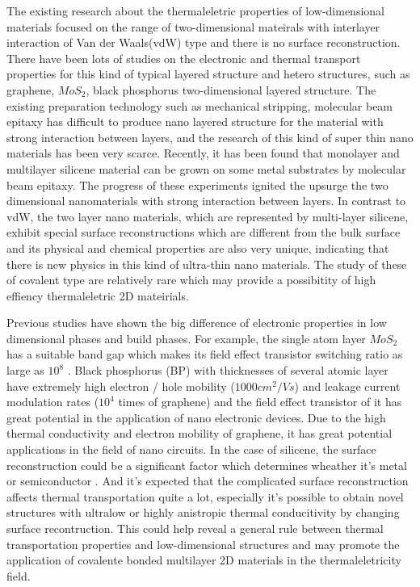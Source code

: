 \documentclass[%
 reprint,
 amsmath,amssymb,
 aps,
 prb,
]{revtex4-1}
\begin{document}
The existing research about the thermaleletric properties of low-dimensional materials focused on the range of  two-dimensional mateirals with interlayer interaction of  Van der Waals(vdW) type and there is no surface reconstruction. There have been lots of studies on the electronic and thermal transport properties for this kind of typical layered structure and hetero structures, such as graphene\cite{Lindsay2011,Ni2012,Wang2011}, $MoS_2$\cite{Liu2015}, black phosphorus\cite{Zhang2015,Peng2015,Jain2015} two-dimensional layered structure. The existing preparation technology such as mechanical stripping, molecular beam epitaxy has difficult to produce nano layered structure for the material with strong interaction between layers, and the research of this kind of super thin nano materials has been very scarce. Recently, it has been found that monolayer and multilayer silicene material can be grown on some metal substrates by molecular beam epitaxy\cite{Fleurence2012,Meng2013,Vogt2012,DePadova2013,Feng2012}. The progress of these experiments ignited the upsurge the two dimensional nanomaterials with strong interaction between layers. In contrast to vdW, the two layer nano materials, which are represented by multi-layer silicene, exhibit special surface reconstructions which are different from the bulk surface\cite{Fleurence2012,Meng2013,Feng2012,Guo2013} and its physical and chemical properties are also very unique\cite{Guo2013,Guo2015}, indicating that there is new physics in this kind of ultra-thin nano materials. The study of these of covalent type are relatively rare which may provide a possibitity of high effiency thermaleletric 2D mateirials.

Previous studies have shown the big difference of electronic properties in low dimensional phases and build phases. For example, the single atom layer $MoS_2$ has a suitable band gap which makes its field effect transistor switching ratio as large as $10^8$ \cite{Li_Yu2014}. Black phosphorus (BP) with thicknesses of several atomic layer have extremely high electron / hole mobility ($1000cm^2/Vs$) and leakage current modulation rates ($10^4$ times of graphene) and the field effect transistor of it has great potential in the application of nano electronic devices\cite{RadisavljevicB2011}. Due to the high thermal conductivity and electron mobility of graphene, it has great potential applications in the field of nano circuits\cite{Chen2008,Balandin2008}. In the case of silicene, the surface reconstruction could be a significant factor which determines wheather it's metal or semiconductor \cite{Guo2015Structural}. And it's expected that the complicated surface reconstruction affects thermal transportation quite a lot, especially it's possible to obtain novel structures with ultralow or highly anistropic thermal conducitivity by changing surface recontruction. This could help reveal a general rule between thermal transportation properties and low-dimensional structures and may promote the application of covalente bonded multilayer 2D materials in the thermaleletricity field.
\end{document}
